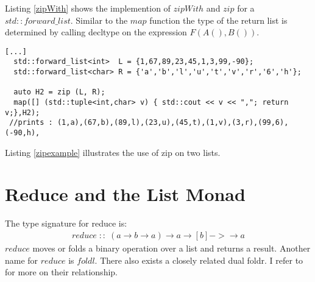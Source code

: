 \documentclass[12pt,fleqn]{article}
\begin{document}
Listing \ref{zipWith} shows the implemention of $zipWith$ and $zip$ for a $std::forward\_list$.
Similar to the $map$ function the type of the return list is determined by calling decltype on the expression $F(A(),B())$.
%
\begin{lstlisting}[caption=zipping two lists, label=zipexample ]
   [...]
  std::forward_list<int>  L = {1,67,89,23,45,1,3,99,-90};
  std::forward_list<char> R = {'a','b','l','u','t','v','r','6','h'};

  auto H2 = zip (L, R);
  map([] (std::tuple<int,char> v) { std::cout << v << ","; return v;},H2); 
 //prints : (1,a),(67,b),(89,l),(23,u),(45,t),(1,v),(3,r),(99,6),(-90,h),
\end{lstlisting}
Listing \ref{zipexample} illustrates the use of zip on two lists.
\begin{comment}
%
%
\begin{lstlisting}[caption=curried version of zipWith, label=curriedZipWith]
template<typename A, typename B, typename F>
auto zipWith (F f) {
  return [=](const std::forward_list<A>& L) {
    return [=](const std::forward_list<B>& R) -> std::forward_list<decltype(f(A(),B()))> {
      std::forward_list<decltype(f(A(),B()))> H;
      std::transform(L.begin(), L.end(), R.begin(), std::front_inserter(H), f);
      H.reverse();
      return H;
    };
  };
};
 [....]
  auto op = [] (int x, char z) {
      return std::make_tuple(x,z);
  };
  auto res = zipWith<int,char>(op)(L)(R);
  map([] (std::tuple<int,char> v) { std::cout << v << ","; return v;}, res);
  //prints : (1,a),(67,b),(89,l),(23,u),(45,t),(1,v),(3,r),(99,6),(-90,h),
\end{lstlisting}
%
Listing \ref{curriedZipWith} is closer to zipWith's curried version shown in the function signature above.
The listing shows the same zip operation as the one in listing \ref{zipexample}.
The line noise in this version has increased because the curried version  requires explicit template instantiation. 
C++'s type system is not powerful enough to infer the types from type of the arguments to {\em op}.
\end{comment}
%
%
\section*{Reduce and the List Monad}
The type signature for reduce is:
\begin{eqnarray*}
reduce \;::\; (a \rightarrow b \rightarrow a) \rightarrow a \rightarrow [b] -> \rightarrow a
\end{eqnarray*}
$reduce$ moves or folds a binary operation over a list and returns a result.
Another name for $reduce$ is $foldl$. There also exists a closely related dual foldr.
I refer to \cite{bird, hutton} for more on their relationship.
\end{document}
